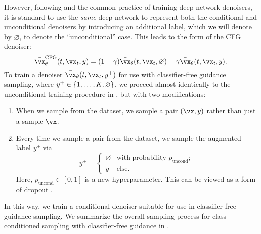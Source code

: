 \documentclass[../../book-main.tex]{subfiles}
\begin{document}
However, following \textcite{Ho2022-ry} and the common practice of training deep network
denoisers, it is standard to use the \textit{same} deep network to represent
both the conditional and unconditional denoisers by introducing an additional
label, which we will denote by $\varnothing$, to denote the ``unconditional''
case.
This leads to the form of the CFG denoiser:
\begin{equation}\label{eq:conditional-denoising-mmse-denoiser-paired-data-approx-cfg}
  \bar{\vx}_{\theta}^{\mathrm{CFG}}(t, \vx_t, y)
  =
  (1 - \gamma) \bar{\vx}_{\theta}(t, \vx_t, \varnothing)
  +
  \gamma \bar{\vx}_{\theta}(t, \vx_t, y).
\end{equation}
To train a denoiser $\bar{\vx}_{\theta}(t, \vx_t, y^+)$ for use with
classifier-free guidance sampling, where $y^+ \in
\set{1, \dots, K, \varnothing}$, we proceed almost identically to the
unconditional training procedure in , but with two
modifications:
\begin{enumerate}
  \item When we sample from the dataset, we sample a pair $(\vx, y)$ rather than
    just a sample $\vx$.
  \item Every time we sample a pair from the dataset, we sample the augmented
    label $y^+$ via
    \begin{equation}
      y^+ = \begin{cases}
        \varnothing & \text{with probability } p_{\mathrm{uncond}}; \\
        y & \text{else}.
      \end{cases}
    \end{equation}
    Here, $p_{\mathrm{uncond}} \in [0, 1]$ is a new hyperparameter.
    This can be viewed as a form of dropout \cite{srivastava2014dropout}.
\end{enumerate}
In this way, we train a conditional denoiser suitable for use in classifier-free
guidance sampling. We summarize the overall sampling process for
class-conditioned sampling with classifier-free guidance in
.
\end{document}
